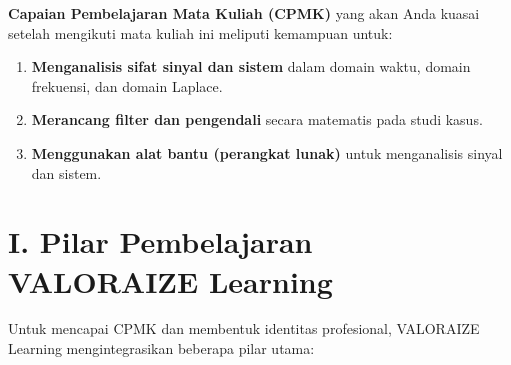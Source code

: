 \documentclass[
  letterpaper,
  DIV=11,
  numbers=noendperiod]{scrreprt}
\providecommand{\tightlist}{%
  \setlength{\itemsep}{0pt}\setlength{\parskip}{0pt}}
\begin{document}
\textbf{Capaian Pembelajaran Mata Kuliah (CPMK)} yang akan Anda kuasai
setelah mengikuti mata kuliah ini meliputi kemampuan untuk:

\begin{enumerate}
\def\labelenumi{\arabic{enumi}.}
\tightlist
\item
  \textbf{Menganalisis sifat sinyal dan sistem} dalam domain waktu,
  domain frekuensi, dan domain Laplace.
\item
  \textbf{Merancang filter dan pengendali} secara matematis pada studi
  kasus.
\item
  \textbf{Menggunakan alat bantu (perangkat lunak)} untuk menganalisis
  sinyal dan sistem.
\end{enumerate}

\section{\texorpdfstring{\textbf{I. Pilar Pembelajaran VALORAIZE
Learning}}{I. Pilar Pembelajaran VALORAIZE Learning}}\label{i.-pilar-pembelajaran-valoraize-learning}

Untuk mencapai CPMK dan membentuk identitas profesional, VALORAIZE
Learning mengintegrasikan beberapa pilar utama:
\end{document}
